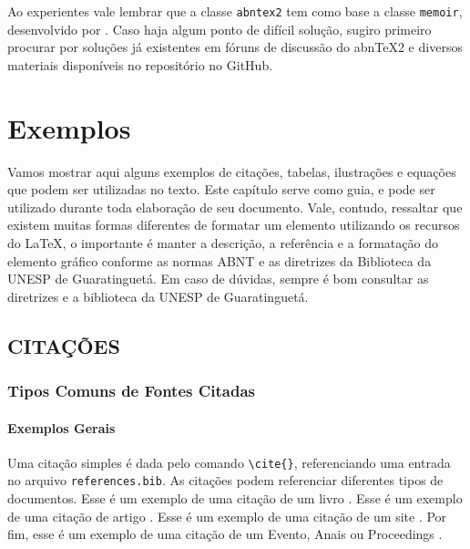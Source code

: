 \documentclass[
  12pt,		%
  a4paper,	%
  openright,%
  oneside,	%
  chapter=TITLE,		%
  section=TITLE,		%
  english,	%
  french,	%
  spanish,	%
  brazil
]{abntex2}
\begin{document}
    Ao experientes vale lembrar que a classe  \verb|abntex2| tem como base a classe  \verb|memoir|, desenvolvido por . Caso haja algum ponto de difícil solução, sugiro primeiro procurar por soluções já existentes em fóruns de discussão do abn\TeX2{} e diversos materiais disponíveis no repositório no GitHub.
    
    
    
    
    \chapter{Exemplos}
    \label{chapter:exemplos}
    
        Vamos mostrar aqui alguns exemplos de citações, tabelas, ilustrações e equações que podem ser utilizadas no texto. Este capítulo serve como guia, e pode ser utilizado durante toda elaboração de seu documento. Vale, contudo, ressaltar que existem muitas formas diferentes de formatar um elemento utilizando os recursos do \LaTeX, o importante é manter a descrição, a referência e a formatação do elemento gráfico conforme as normas ABNT e as diretrizes da Biblioteca da UNESP de Guaratinguetá. Em caso de dúvidas, sempre é bom consultar as diretrizes e a biblioteca da UNESP de Guaratinguetá.
        
         \section{CITAÇÕES}
         
         \subsection{Tipos Comuns de Fontes Citadas}
         
         \subsubsection{Exemplos Gerais}
         
            Uma citação \cite{carbono} simples é dada pelo comando \verb|\cite{}|, referenciando uma entrada no arquivo \verb|references.bib|. As citações podem referenciar diferentes tipos de documentos. Esse é um exemplo de uma citação de um livro \cite{livro}. Esse é um exemplo de uma citação de artigo \cite{artigo}. Esse é um exemplo de uma citação de um site \cite{website}. Por fim, esse é um exemplo de uma citação de um Evento, Anais ou Proceedings \cite{inproceedings}.
            
\end{document}
